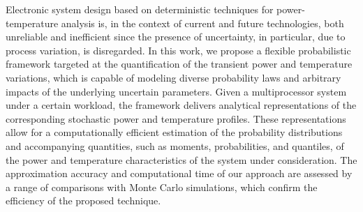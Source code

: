 Electronic system design based on deterministic techniques for power-temperature analysis is, in the context of current and future technologies, both unreliable and inefficient since the presence of uncertainty, in particular, due to process variation, is disregarded.
In this work, we propose a flexible probabilistic framework targeted at the quantification of the transient power and temperature variations, which is capable of modeling diverse probability laws and arbitrary impacts of the underlying uncertain parameters.
Given a multiprocessor system under a certain workload, the framework delivers analytical representations of the corresponding stochastic power and temperature profiles.
These representations allow for a computationally efficient estimation of the probability distributions and accompanying quantities, such as moments, probabilities, and quantiles, of the power and temperature characteristics of the system under consideration.
The approximation accuracy and computational time of our approach are assessed by a range of comparisons with Monte Carlo simulations, which confirm the efficiency of the proposed technique.
